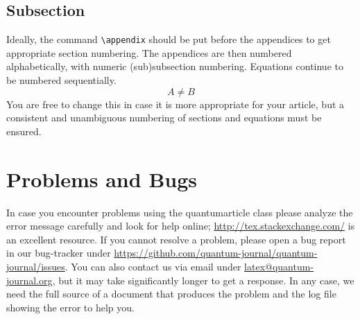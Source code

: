 \documentclass[a4paper,twocolumn,11pt,accepted=2017-05-09]{quantumarticle}
\begin{document}
\subsection{Subsection}
Ideally, the command \texttt{\textbackslash{}appendix} should be put before the appendices to get appropriate section numbering.
The appendices are then numbered alphabetically, with numeric (sub)subsection numbering.
Equations continue to be numbered sequentially.
\begin{equation}
  A \neq B
\end{equation}
You are free to change this in case it is more appropriate for your article, but a consistent and unambiguous numbering of sections and equations must be ensured.

\section{Problems and Bugs}
In case you encounter problems using the quantumarticle class please analyze the error message carefully and look for help online; \href{http://tex.stackexchange.com/}{http://tex.stackexchange.com/} is an excellent resource.
If you cannot resolve a problem, please open a bug report in our bug-tracker under \href{https://github.com/quantum-journal/quantum-journal/issues}{https://github.com/quantum-journal/quantum-journal/issues}.
You can also contact us via email under \href{mailto:latex@quantum-journal.org}{latex@quantum-journal.org}, but it may take significantly longer to get a response.
In any case, we need the full source of a document that produces the problem and the log file showing the error to help you.
\end{document}
